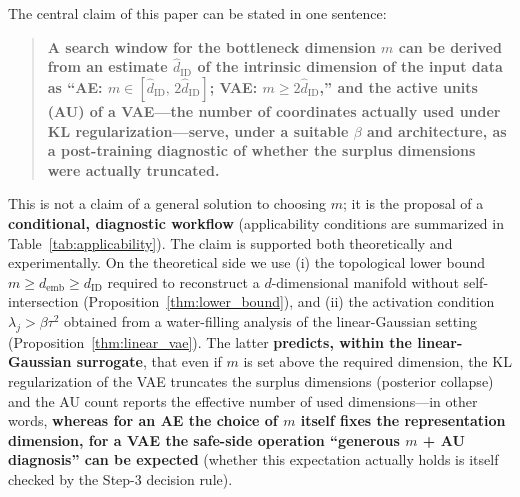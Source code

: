 \documentclass[make,article,submit,pdftex,moreauthors]{Definitions/mdpi}
\newcommand{\dID}{d_{\mathrm{ID}}}
\newcommand{\hatdID}{\hat{d}_{\mathrm{ID}}}
\newcommand{\demb}{d_{\mathrm{emb}}}
\begin{document}
The central claim of this paper can be stated in one sentence:
\begin{quote}
\textbf{A search window for the bottleneck dimension $m$ can be derived
from an estimate $\hatdID$ of the intrinsic dimension of the input data as
``AE: $m \in [\hatdID,\, 2\hatdID]$; VAE: $m \geq 2\hatdID$,'' and the
active units (AU) of a VAE---the number of coordinates actually used under
KL regularization---serve, under a suitable $\beta$ and architecture, as a
post-training diagnostic of whether the surplus dimensions were actually
truncated.}
\end{quote}
This is not a claim of a general solution to choosing $m$; it is the
proposal of a \textbf{conditional, diagnostic workflow}
(applicability conditions are summarized in Table~\ref{tab:applicability}).
The claim is supported both theoretically and experimentally.
On the theoretical side we use (i) the topological lower bound
$m \geq \demb \geq \dID$ required to reconstruct a $d$-dimensional manifold
without self-intersection (Proposition~\ref{thm:lower_bound}), and (ii) the
activation condition $\lambda_j > \beta\tau^2$ obtained from a water-filling
analysis of the linear-Gaussian setting
(Proposition~\ref{thm:linear_vae}).
The latter \textbf{predicts, within the linear-Gaussian surrogate}, that
even if $m$ is set above the required dimension, the KL regularization of
the VAE truncates the surplus dimensions (posterior collapse) and the AU
count reports the effective number of used dimensions---in other words,
\textbf{whereas for an AE the choice of $m$ itself fixes the representation
dimension, for a VAE the safe-side operation ``generous $m$ + AU
diagnosis'' can be expected} (whether this expectation actually holds is
itself checked by the Step-3 decision rule).
\end{document}

